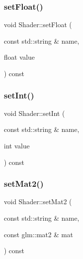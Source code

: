 \mbox{\label{classShader_afe7367621f74c2d26431d8ac15252bf3}} 
\subsubsection{\texorpdfstring{set\+Float()}{setFloat()}}
{\footnotesize\ttfamily void Shader\+::set\+Float (\begin{DoxyParamCaption}\item[{const std\+::string \&}]{name,  }\item[{float}]{value }\end{DoxyParamCaption}) const\hspace{0.3cm}{\ttfamily [inline]}}

\mbox{\label{classShader_ad362e2b654cd95a3574cd505411e41fd}} 
\subsubsection{\texorpdfstring{set\+Int()}{setInt()}}
{\footnotesize\ttfamily void Shader\+::set\+Int (\begin{DoxyParamCaption}\item[{const std\+::string \&}]{name,  }\item[{int}]{value }\end{DoxyParamCaption}) const\hspace{0.3cm}{\ttfamily [inline]}}

\mbox{\label{classShader_a91a6ee79b959cacd618c9e29a5bbd732}} 
\subsubsection{\texorpdfstring{set\+Mat2()}{setMat2()}}
{\footnotesize\ttfamily void Shader\+::set\+Mat2 (\begin{DoxyParamCaption}\item[{const std\+::string \&}]{name,  }\item[{const glm\+::mat2 \&}]{mat }\end{DoxyParamCaption}) const\hspace{0.3cm}{\ttfamily [inline]}}

